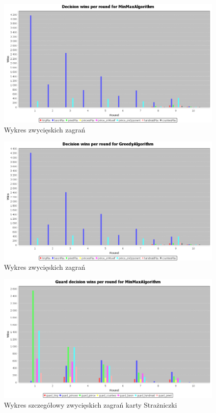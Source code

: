 \begin{figure}[H]
	\centering
	\includegraphics[width=\textwidth]{Resources/MirrorMmVsG/MmVsGDecision.PNG}
	\caption{Wykres zwycięskich zagrań} 
	\label{fig:MirrorMmVsGDecision}
\end{figure} 

\begin{figure}[H]
	\centering
	\includegraphics[width=\textwidth]{Resources/MirrorMmVsG/GVsMmDecision.PNG}
	\caption{Wykres zwycięskich zagrań} 
	\label{fig:MirrorGVsMmDecision}
\end{figure} 

\begin{figure}[H]
	\centering
	\includegraphics[width=\textwidth]{Resources/MirrorMmVsG/MmVsGGuardDecision.PNG}
	\caption{Wykres szczegółowy zwycięskich zagrań karty Strażniczki} 
	\label{fig:MmVsGGuardDecisionn}
\end{figure}

